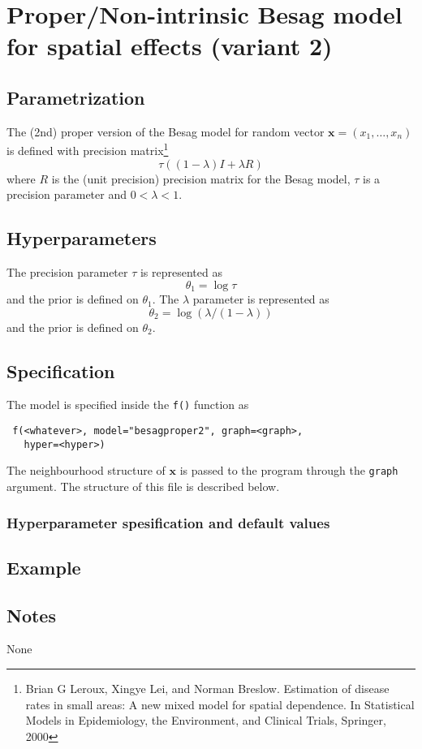 \documentclass[a4paper,11pt]{article}
\begin{document}
\section*{Proper/Non-intrinsic Besag model for spatial effects
    (variant 2)}

\subsection*{Parametrization}

The (2nd) proper version of the Besag model for random vector
$\mathbf{x}=(x_1,\dots,x_n)$ is defined with precision
matrix\footnote{ Brian G Leroux, Xingye Lei, and Norman
    Breslow. Estimation of disease rates in small areas: A new mixed
    model for spatial dependence. In Statistical Models in
    Epidemiology, the Environment, and Clinical Trials,
    Springer, 2000}
\begin{equation}\label{eq.besag}
    \tau ((1-\lambda) I + \lambda R)
\end{equation}
where $R$ is the (unit precision) precision matrix for the Besag
model, $\tau$ is a precision parameter and $0<\lambda<1$.

\subsection*{Hyperparameters}

The precision parameter $\tau$ is represented as
\begin{displaymath}
    \theta_{1} =\log \tau
\end{displaymath}
and the prior is defined on $\theta_{1}$. The $\lambda$ parameter is
represented as
\begin{displaymath}
    \theta_{2} = \log\left( \lambda/(1-\lambda)\right)
\end{displaymath}
and the prior is defined on $\theta_{2}$. 

\subsection*{Specification}

The model is specified inside the {\tt f()} function as
\begin{verbatim}
 f(<whatever>, model="besagproper2", graph=<graph>,
   hyper=<hyper>)
\end{verbatim}

The neighbourhood structure of $\mathbf{x}$ is passed to the program
through the {\tt graph} argument.  The structure of this file is
described below.

\subsubsection*{Hyperparameter spesification and default values}



\subsection*{Example}



\subsection*{Notes}

None
\end{document}
